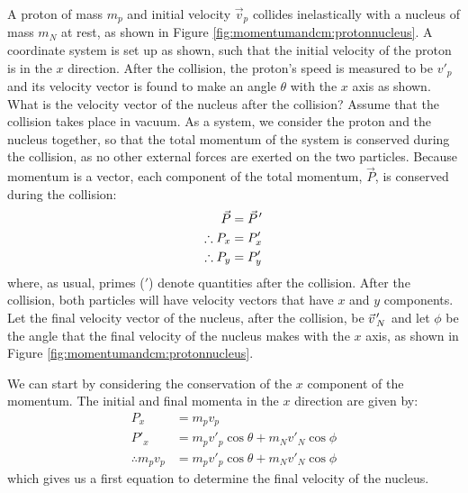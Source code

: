 \begin{example}{
A proton of mass $m_p$ and initial velocity $\vec v_p$ collides inelastically with a nucleus of mass $m_N$ at rest, as shown in Figure \ref{fig:momentumandcm:protonnucleus}. A coordinate system is set up as shown, such that the initial velocity of the proton is in the $x$ direction. After the collision, the proton's speed is measured to be $v'_p$ and its velocity vector is found to make an angle $\theta$ with the $x$ axis as shown. What is the velocity vector of the nucleus after the collision? Assume that the collision takes place in vacuum.}
As a system, we consider the proton and the nucleus together, so that the total momentum of the system is conserved during the collision, as no other external forces are exerted on the two particles. Because momentum is a vector, each component of the total momentum, $\vec P$, is conserved during the collision:
\begin{align*}
\vec P &= \pvec P'\\
\therefore P_x &= P'_x\\
\therefore P_y &= P'_y\\
\end{align*}
where, as usual, primes ($'$) denote quantities after the collision. After the collision, both particles will have velocity vectors that have $x$ and $y$ components. Let the final velocity vector of the nucleus, after the collision, be $\pvec v'_N$ and let $\phi$ be the angle that the final velocity of the nucleus makes with the $x$ axis, as shown in Figure \ref{fig:momentumandcm:protonnucleus}. 

We can start by considering the conservation of the $x$ component of the momentum. The initial and final momenta in the $x$ direction are given by:
\begin{align*}
P_x &= m_p v_p\\
P'_x &= m_p v'_p\cos\theta + m_N v'_N\cos\phi\\
\therefore m_p v_p &= m_p v'_p\cos\theta + m_N v'_N\cos\phi
\end{align*}
which gives us a first equation to determine the final velocity of the nucleus.


\end{example}

